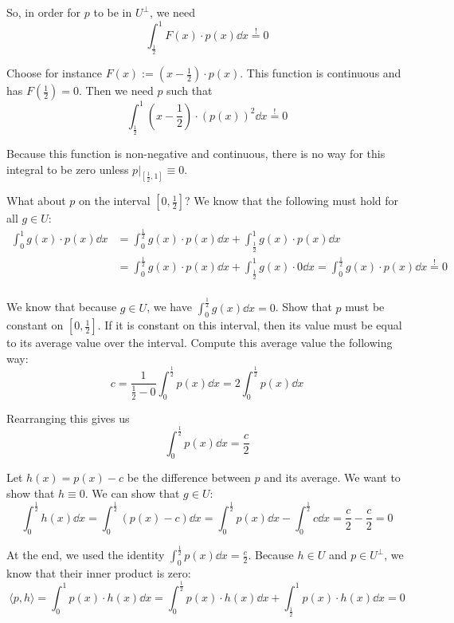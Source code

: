 \documentclass[12pt]{article}
\begin{document}
\begin{enumerate}[label=\alph*)]
    So, in order for $p$ to be in $U^\perp$, we need
    $$
        \int_{\frac{1}{2}}^1 F(x) \cdot p(x) \dd x \overset{!}= 0
    $$

    Choose for instance $F(x) := (x - \frac{1}{2}) \cdot p(x)$. This function is continuous and has $F(\frac{1}{2}) = 0$. Then we need $p$ such that
    $$
        \int_{\frac{1}{2}}^1 (x - \frac{1}{2}) \cdot (p(x))^2 \dd x \overset{!}= 0
    $$

    Because this function is non-negative and continuous, there is no way for this integral to be zero unless $p|_{[\frac{1}{2}, 1]} \equiv 0$.

    What about $p$ on the interval $[0, \frac{1}{2}]$? We know that the following must hold for all $g \in U$:
    $$
    \begin{aligned}
        \int_0^1 g(x) \cdot p(x) \dd x &= \int_{0}^{\frac{1}{2}} g(x) \cdot p(x) \dd x + \int_{\frac{1}{2}}^1 g(x) \cdot p(x) \dd x \\
        &= \int_{0}^{\frac{1}{2}} g(x) \cdot p(x) \dd x + \int_{\frac{1}{2}}^1 g(x) \cdot 0 \dd x = \int_{0}^{\frac{1}{2}} g(x) \cdot p(x) \dd x \overset{!}= 0\\
    \end{aligned}
    $$

    We know that because $g \in U$, we have $\int_0^{\frac{1}{2}} g(x) \dd x = 0$. Show that $p$ must be constant on $[0, \frac{1}{2}]$. If it is constant on this interval, then its value must be equal to its average value over the interval. Compute this average value the following way:
    $$
        c = \frac{1}{\frac{1}{2} - 0} \int_{0}^{\frac{1}{2}} p(x) \dd x = 2 \int_{0}^{\frac{1}{2}} p(x) \dd x
    $$

    Rearranging this gives us
    $$
        \int_{0}^{\frac{1}{2}} p(x) \dd x = \frac{c}{2}
    $$

    Let $h(x) = p(x) - c$ be the difference between $p$ and its average. We want to show that $h \equiv 0$. We can show that $g \in U$:
    $$
        \int_0^{\frac{1}{2}} h(x) \dd x =  \int_0^{\frac{1}{2}} \left(p(x) - c\right) \dd x = \int_0^{\frac{1}{2}} p(x) \dd x - \int_0^{\frac{1}{2}} c \dd x = \frac{c}{2} - \frac{c}{2} = 0 
    $$

    At the end, we used the identity $\int_{0}^{\frac{1}{2}} p(x) \dd x = \frac{c}{2}$. Because $h \in U$ and $p \in U^\perp$, we know that their inner product is zero:
    $$
        \langle p, h \rangle = \int_0^1 p(x) \cdot h(x) \dd x = \int_0^{\frac{1}{2}} p(x) \cdot h(x) \dd x + \int_\frac{1}{2}^1 p(x) \cdot h(x) \dd x = 0
    $$


\end{enumerate}
\end{document}
